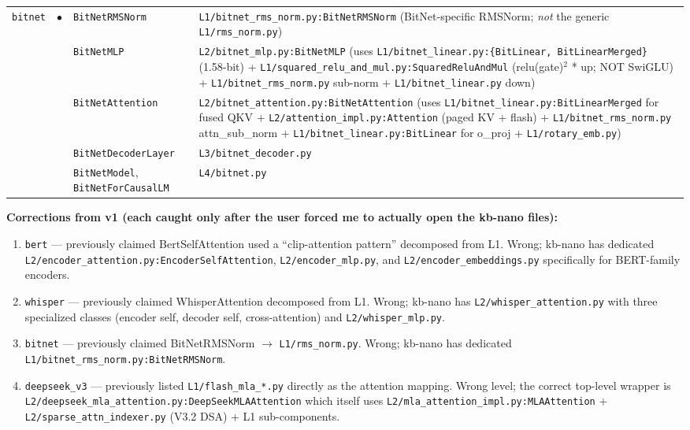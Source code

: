 \documentclass[10pt]{article}
\begin{document}
{\begin{longtable}{@{}p{1.6cm} c p{4.0cm} p{14.5cm}@{}}
\multirow{6}{*}{\texttt{bitnet}} & \multirow{6}{*}{$\bullet$}
   & \texttt{BitNetRMSNorm}           & \texttt{L1/bitnet\_rms\_norm.py:BitNetRMSNorm} (BitNet-specific RMSNorm; \emph{not} the generic \texttt{L1/rms\_norm.py}) \\
&& \texttt{BitNetMLP}                 & \texttt{L2/bitnet\_mlp.py:BitNetMLP} (uses \texttt{L1/bitnet\_linear.py:\{BitLinear, BitLinearMerged\}} (1.58-bit) + \texttt{L1/squared\_relu\_and\_mul.py:SquaredReluAndMul} (relu(gate)$^2$ * up; NOT SwiGLU) + \texttt{L1/bitnet\_rms\_norm.py} sub-norm + \texttt{L1/bitnet\_linear.py} down) \\
&& \texttt{BitNetAttention}           & \texttt{L2/bitnet\_attention.py:BitNetAttention} (uses \texttt{L1/bitnet\_linear.py:BitLinearMerged} for fused QKV + \texttt{L2/attention\_impl.py:Attention} (paged KV + flash) + \texttt{L1/bitnet\_rms\_norm.py} attn\_sub\_norm + \texttt{L1/bitnet\_linear.py:BitLinear} for o\_proj + \texttt{L1/rotary\_emb.py}) \\
&& \texttt{BitNetDecoderLayer}        & \texttt{L3/bitnet\_decoder.py} \\
&& \texttt{BitNetModel}, \texttt{BitNetForCausalLM} & \texttt{L4/bitnet.py} \\

\end{longtable}
}

\bigskip

\noindent\textbf{Corrections from v1 (each caught only after the user forced
me to actually open the kb-nano files):}
\begin{enumerate}\itemsep0pt
\item \texttt{bert} --- previously claimed BertSelfAttention used a
  ``clip-attention pattern'' decomposed from L1. Wrong; kb-nano has dedicated
  \texttt{L2/encoder\_attention.py:EncoderSelfAttention},
  \texttt{L2/encoder\_mlp.py}, and \texttt{L2/encoder\_embeddings.py}
  specifically for BERT-family encoders.
\item \texttt{whisper} --- previously claimed WhisperAttention decomposed
  from L1. Wrong; kb-nano has \texttt{L2/whisper\_attention.py} with three
  specialized classes (encoder self, decoder self, cross-attention) and
  \texttt{L2/whisper\_mlp.py}.
\item \texttt{bitnet} --- previously claimed BitNetRMSNorm $\to$
  \texttt{L1/rms\_norm.py}. Wrong; kb-nano has dedicated
  \texttt{L1/bitnet\_rms\_norm.py:BitNetRMSNorm}.
\item \texttt{deepseek\_v3} --- previously listed
  \texttt{L1/flash\_mla\_*.py} directly as the attention mapping. Wrong
  level; the correct top-level wrapper is
  \texttt{L2/deepseek\_mla\_attention.py:DeepSeekMLAAttention} which
  itself uses \texttt{L2/mla\_attention\_impl.py:MLAAttention} +
  \texttt{L2/sparse\_attn\_indexer.py} (V3.2 DSA) + L1 sub-components.
\end{enumerate}
\end{document}
